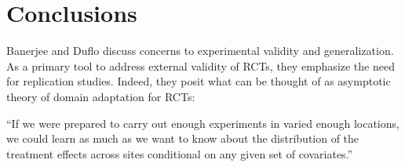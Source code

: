 \documentclass[a4paper,12pt]{article}
\begin{document}















\section{Conclusions}

Banerjee and Duflo \parencite*{Banerjee2014} discuss concerns to experimental validity and generalization. As a primary tool to address external validity of RCTs, they emphasize the need for replication studies. Indeed, they posit what can be thought of as asymptotic theory of domain adaptation for RCTs:

\begin{displayquote}
``If we were prepared to carry out enough experiments in varied enough locations, we could learn as much as we want to know about the distribution of the treatment effects across sites conditional on any given set of covariates.''
\end{displayquote}
\end{document}
